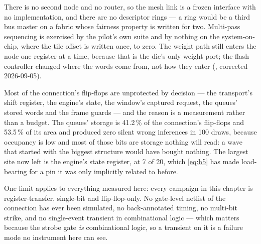 There is no second node and no router, so the mesh link is a frozen
interface with no implementation, and there are no descriptor rings
--- a ring would be a third bus master on a fabric whose fairness
property is written for two. Multi-pass sequencing is exercised by the
pilot's own suite and by nothing on the system-on-chip, where the tile
offset is written once, to zero. The weight path still enters the node
one register at a time, because that is the die's only weight port; the
flash controller changed where the words come from, not how they enter
(, corrected 2026-09-05).

Most of the connection's flip-flops are unprotected by decision --- the
transport's shift register, the engine's state, the window's captured
request, the queues' stored words and the frame guards --- and the
reason is a measurement rather than a budget. The queues' storage is
41.2\,\% of the connection's flip-flops and 53.5\,\% of its area and
produced zero silent wrong inferences in 100 draws, because occupancy
is low and most of those bits are storage nothing will read: a wave
that started with the biggest structure would have bought nothing. The
largest site now left is the engine's state register, at 7 of 20, which
\cref{eq:h5} has made load-bearing for a pin it was only implicitly
related to before.

One limit applies to everything measured here: every campaign in this
chapter is register-transfer, single-bit and flip-flop-only. No
gate-level netlist of the connection has ever been simulated, no
back-annotated timing, no multi-bit strike, and no single-event
transient in combinational logic --- which matters because the strobe
gate \emph{is} combinational logic, so a transient on it is a failure
mode no instrument here can see.
